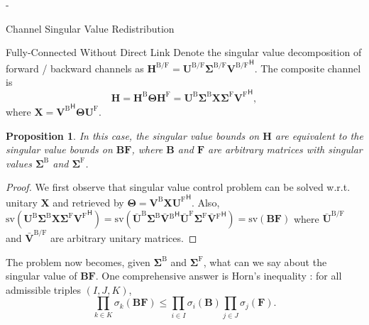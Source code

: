 \documentclass[journal]{IEEEtran}
\newtheorem{proposition}{Proposition}
\begin{document}
\begin{section}{-}
\begin{subsection}{Channel Singular Value Redistribution}
		\begin{subsubsection}{Fully-Connected  Without Direct Link}
			Denote the singular value decomposition of forward / backward channels as $\mathbf{H}^{\mathrm{B}/\mathrm{F}} = \mathbf{U}^{\mathrm{B}/\mathrm{F}} \mathbf{\Sigma}^{\mathrm{B}/\mathrm{F}} {\mathbf{V}^{\mathrm{B}/\mathrm{F}}}^\mathsf{H}$.
			The composite channel is
			\begin{equation}
				\mathbf{H} = \mathbf{H}^\mathrm{B} \mathbf{\Theta} \mathbf{H}^\mathrm{F} = \mathbf{U}^\mathrm{B} \mathbf{\Sigma}^\mathrm{B} \mathbf{X} \mathbf{\Sigma}^\mathrm{F} {\mathbf{V}^\mathrm{F}}^\mathsf{H},
			\end{equation}
			where $\mathbf{X} = {\mathbf{V}^\mathrm{B}}^\mathsf{H} \mathbf{\Theta} \mathbf{U}^\mathrm{F}$.
			\begin{proposition}
				In this case, the singular value bounds on $\mathbf{H}$ are equivalent to the singular value bounds on $\mathbf{BF}$, where $\mathbf{B}$ and $\mathbf{F}$ are arbitrary matrices with singular values $\mathbf{\Sigma}^\mathrm{B}$ and $\mathbf{\Sigma}^\mathrm{F}$.
			\end{proposition}
			\begin{proof}
				We first observe that singular value control problem can be solved w.r.t. unitary $\mathbf{X}$ and retrieved by $\mathbf{\Theta} = \mathbf{V}^\mathrm{B} \mathbf{X} {\mathbf{U}^\mathrm{F}}^\mathsf{H}$.
				Also, $\mathrm{sv}(\mathbf{U}^\mathrm{B} \mathbf{\Sigma}^\mathrm{B} \mathbf{X} \mathbf{\Sigma}^\mathrm{F} {\mathbf{V}^\mathrm{F}}^\mathsf{H}) = \mathrm{sv}(\bar{\mathbf{U}}^\mathrm{B} \mathbf{\Sigma}^\mathrm{B} \mathbf{\bar{V}}{{}^\mathrm{B}}^\mathsf{H} \bar{\mathbf{U}}^\mathrm{F} \mathbf{\Sigma}^\mathrm{F} \mathbf{\bar{V}}{{}^\mathrm{F}}^\mathsf{H}) = \mathrm{sv}(\mathbf{BF})$ where $\bar{\mathbf{U}}^{\mathrm{B}/\mathrm{F}}$ and $\bar{\mathbf{V}}^{\mathrm{B}/\mathrm{F}}$ are arbitrary unitary matrices.
			\end{proof}
			The problem now becomes, given $\mathbf{\Sigma}^\mathrm{B}$ and $\mathbf{\Sigma}^\mathrm{F}$, what can we say about the singular value of $\mathbf{BF}$.
			One comprehensive answer is Horn's inequality \cite{Bhatia2001}: for all admissible triples $(I, J, K)$,
			\begin{equation}
				\prod_{k \in {K}} \sigma_k(\mathbf{BF}) \leq \prod_{i \in {I}} \sigma_i(\mathbf{B}) \prod_{j \in {J}} \sigma_j(\mathbf{F}).

\end{equation}
\end{subsubsection}
\end{subsection}
\end{section}
\end{document}
